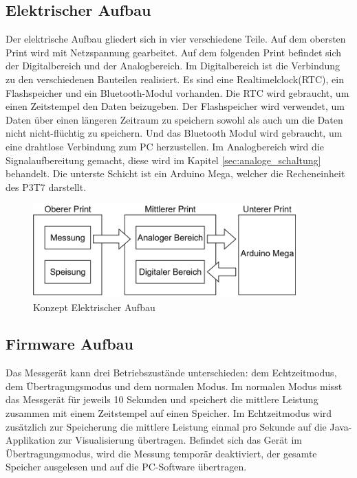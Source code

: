 \subsection{Elektrischer Aufbau}
Der elektrische Aufbau gliedert sich in vier verschiedene Teile. Auf dem obersten Print wird mit Netzspannung gearbeitet. Auf dem folgenden Print befindet sich der Digitalbereich und der Analogbereich. Im Digitalbereich ist die Verbindung zu den verschiedenen Bauteilen realisiert. Es sind eine Realtimelclock(RTC), ein Flashspeicher und ein Bluetooth-Modul vorhanden. Die RTC wird gebraucht, um einen Zeitstempel den Daten beizugeben. Der Flashspeicher wird verwendet, um Daten über einen längeren Zeitraum zu speichern sowohl als auch um die Daten nicht nicht-flüchtig zu speichern. Und das Bluetooth Modul wird gebraucht, um eine drahtlose Verbindung zum PC herzustellen. Im Analogbereich wird die Signalaufbereitung gemacht, diese wird im Kapitel \ref{sec:analoge_schaltung} behandelt. Die unterste Schicht ist ein Arduino Mega, welcher die Recheneinheit des P3T7 darstellt.

\begin{figure}[H]
\begin{center}
\includegraphics[width=0.9\textwidth]{images/Konzept_Elektrischer_Aufbau.png}
\caption{Konzept Elektrischer Aufbau}
\end{center}
\end{figure}


\subsection{Firmware Aufbau}
Das Messgerät kann drei Betriebszustände unterschieden: dem Echtzeitmodus, dem Übertragungsmodus und dem normalen Modus. Im normalen Modus misst das Messgerät für jeweils 10 Sekunden und speichert die mittlere Leistung zusammen mit einem Zeitstempel auf einen Speicher. Im Echtzeitmodus wird zusätzlich zur Speicherung die mittlere Leistung einmal pro Sekunde auf die Java-Applikation zur Visualisierung übertragen. Befindet sich das Gerät im Übertragungsmodus, wird die Messung temporär deaktiviert, der gesamte Speicher ausgelesen und auf die PC-Software übertragen.

